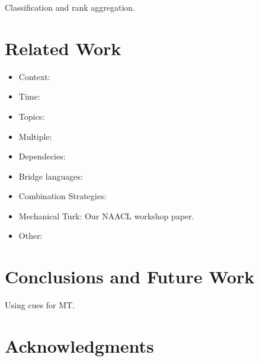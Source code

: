 \documentclass[11pt]{article}
\begin{document}
Classification and rank aggregation.



\section{Related Work} \label{sect:relwork}

\begin{itemize}
\setlength{\parskip}{0pt}
  \item Context: \cite{Rapp:1995,Rapp:1999,Fung:1998}
  \item Time: \cite{Schafer:2002,Klementiev:2006b}
  \item Topics: \cite{Mimno:2009,Boyd-Graber:2009}
  \item Multiple: \cite{Schafer:2002,Koehn:2000,Haghighi:2008}
  \item Dependecies: \cite{Garera:2009}
  \item Bridge languages: \cite{Mann:2001}
  \item Combination Strategies: \cite{Koehn:2000,Klementiev:2006b,Klementiev:2008a}
  \item Mechanical Turk: Our NAACL workshop paper.
  \item Other: \cite{Monz:2005}
\end{itemize}

\section{Conclusions and Future Work} \label{sect:conclusions}

Using cues for MT.

\section*{Acknowledgments}



\end{document}
